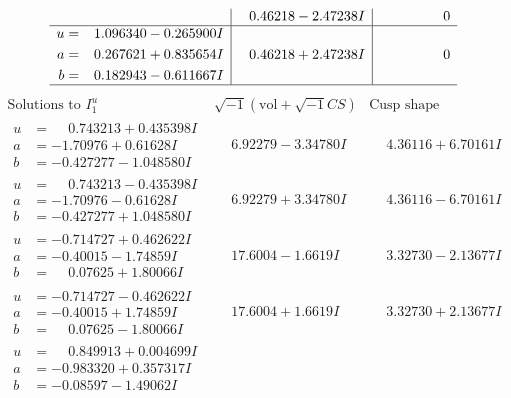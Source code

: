 \documentclass[1p]{elsarticle_modified}
\theoremstyle{definition}
\newcommand{\I}{\sqrt{-1}}
\begin{document}
$$\begin{array}{c|c|c}
 & \phantom{-}0.46218 - 2.47238 I & \phantom{-0.000000 } 0 \\ \hline\begin{aligned}
u &= \phantom{-}1.096340 - 0.265900 I \\
a &= \phantom{-}0.267621 + 0.835654 I \\
b &= \phantom{-}0.182943 - 0.611667 I\end{aligned}
 & \phantom{-}0.46218 + 2.47238 I & \phantom{-0.000000 } 0\\
 \hline 
 \end{array}$$\newpage$$\begin{array}{c|c|c}  
\text{Solutions to }I^u_{1}& \I (\text{vol} + \sqrt{-1}CS) & \text{Cusp shape}\\
 \hline 
\begin{aligned}
u &= \phantom{-}0.743213 + 0.435398 I \\
a &= -1.70976 + 0.61628 I \\
b &= -0.427277 - 1.048580 I\end{aligned}
 & \phantom{-}6.92279 - 3.34780 I & \phantom{-}4.36116 + 6.70161 I \\ \hline\begin{aligned}
u &= \phantom{-}0.743213 - 0.435398 I \\
a &= -1.70976 - 0.61628 I \\
b &= -0.427277 + 1.048580 I\end{aligned}
 & \phantom{-}6.92279 + 3.34780 I & \phantom{-}4.36116 - 6.70161 I \\ \hline\begin{aligned}
u &= -0.714727 + 0.462622 I \\
a &= -0.40015 - 1.74859 I \\
b &= \phantom{-}0.07625 + 1.80066 I\end{aligned}
 & \phantom{-}17.6004 - 1.6619 I & \phantom{-}3.32730 - 2.13677 I \\ \hline\begin{aligned}
u &= -0.714727 - 0.462622 I \\
a &= -0.40015 + 1.74859 I \\
b &= \phantom{-}0.07625 - 1.80066 I\end{aligned}
 & \phantom{-}17.6004 + 1.6619 I & \phantom{-}3.32730 + 2.13677 I \\ \hline\begin{aligned}
u &= \phantom{-}0.849913 + 0.004699 I \\
a &= -0.983320 + 0.357317 I \\
b &= -0.08597 - 1.49062 I\end{aligned}

\end{array}$$
\end{document}
